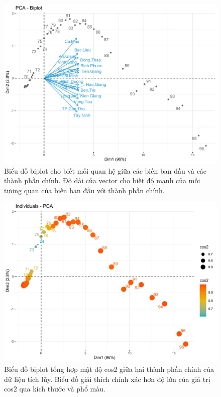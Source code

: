 \documentclass[../thesis.tex]{subfiles}
\begin{document}
\begin{figure}[H]
	\centering
	\includegraphics[width=0.75\linewidth]{images/biplot_cul}
	\caption[Biểu đồ biplot cho dữ liệu hằng ngày]{Biểu đồ biplot cho biết mối quan hệ giữa các biến ban đầu và các thành phần chính. Độ dài của vector cho biết độ mạnh của mối tương quan của biến ban đầu với thành phần chính.}
	\label{fig:biplotcul}
\end{figure}

\begin{Shaded}
	\begin{Highlighting}[]
\SpecialCharTok{\%\textgreater{}\%} 
		 \NormalTok{,}
		 \NormalTok{,}
		 \NormalTok{(}\NormalTok{, }\NormalTok{, }\NormalTok{),}
		 \NormalTok{) }
	\end{Highlighting}
\end{Shaded}


\begin{figure}[H]
	\centering
	\includegraphics[width=0.75\linewidth]{images/ind_cul}
	\caption[Biểu đồ biplot tổng hợp mật độ cos2 giữa hai thành phần chính của dữ liệu tích lũy]{Biểu đồ biplot tổng hợp mật độ cos2 giữa hai thành phần chính của dữ liệu tích lũy. Biểu đồ giải thích chính xác hơn độ lớn của giá trị cos2 qua kích thước và phổ màu.}
	\label{fig:indcul}
\end{figure}
\end{document}
